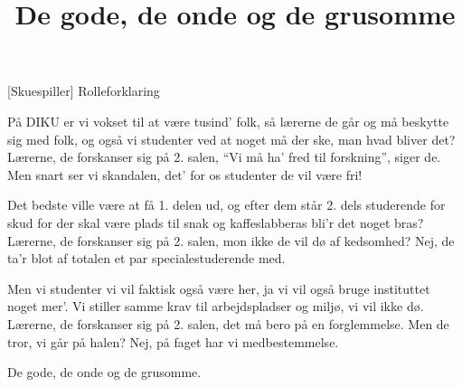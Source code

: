 \documentclass[a4paper,11pt]{article}
\title{De gode, de onde og de grusomme}
\author{}
\begin{document}
\maketitle

\begin{roles}
  [Skuespiller] Rolleforklaring
\end{roles}

\begin{song}
  På DIKU er vi vokset til at være tusind' folk,
  så lærerne de går og må beskytte sig med folk,
  og også vi studenter ved at noget må der ske,
  man hvad bliver det?
  Lærerne, de forskanser sig på 2. salen,
  "`Vi må ha' fred til forskning"', siger de.
  Men snart ser vi skandalen,
  det' for os studenter de vil være fri!

  Det bedste ville være at få 1. delen ud,
  og efter dem står 2. dels studerende for skud
  for der skal være plads til snak og kaffeslabberas
  bli'r det noget bras?
  Lærerne, de forskanser sig på 2. salen,
  mon ikke de vil dø af kedsomhed?
  Nej, de ta'r blot af totalen
  et par specialestuderende med.

  Men vi studenter vi vil faktisk også være her,
  ja vi vil også bruge instituttet noget mer'.
  Vi stiller samme krav til arbejdspladser og miljø,
  vi vil ikke dø.
  Lærerne, de forskanser sig på 2. salen,
  det må bero på en forglemmelse.
  Men de tror, vi går på halen?
  Nej, på faget har vi medbestemmelse.

  De gode, de onde og de grusomme.
\end{song}
\end{document}

